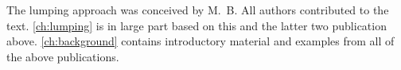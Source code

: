 The lumping approach was conceived by M.\ B.
All authors contributed to the text.
\autoref{ch:lumping} is in large part based on this and the latter two publication above.
\autoref{ch:background} contains introductory material and examples from all of the above publications.


% 


